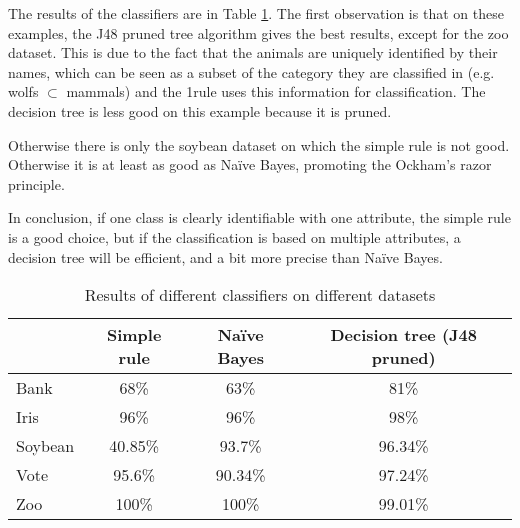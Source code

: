 \documentclass[fontsize=12pt, usenames, dvipsnames, headinclude, headsepline, footinclude, footsepline]{scrartcl}
\begin{document}
  \begin{sol}
    The results of the classifiers are in Table \ref{table:1}. The first observation is that on these
    examples, the J48 pruned tree algorithm gives the best results, except for the zoo dataset. This is due to
    the fact that the animals are uniquely identified by their names, which can be seen as a subset of the
    category they are classified in (e.g. wolfs $\subset$ mammals) and the 1rule uses this information for
    classification. The decision tree is less good on this example because it is pruned. 

    Otherwise there is only the soybean dataset on which the simple rule is not good. Otherwise it is at least
    as good as Naïve Bayes, promoting the Ockham's razor principle. 

    In conclusion, if one class is clearly identifiable with one attribute, the simple rule is a good choice,
    but if the classification is based on multiple attributes, a decision tree will be efficient, and a bit
    more precise than Naïve Bayes.
  \end{sol}

\begin{table}[]
\centering
\caption{Results of different classifiers on different datasets}
\label{table:1}
\begin{tabular}{@{}lccc@{}}
\toprule
        & Simple rule & Naïve Bayes & Decision tree (J48 pruned) \\ \midrule
Bank    & 68\%        & 63\%        & 81\%                       \\ \midrule
Iris    & 96\%        & 96\%        & 98\%                       \\ \midrule
Soybean & 40.85\%     & 93.7\%      & 96.34\%                    \\ \midrule
Vote    & 95.6\%      & 90.34\%     & 97.24\%                    \\ \midrule
Zoo     & 100\%       & 100\%       & 99.01\%                    \\ \bottomrule
\end{tabular}
\end{table}
	
\end{document}
